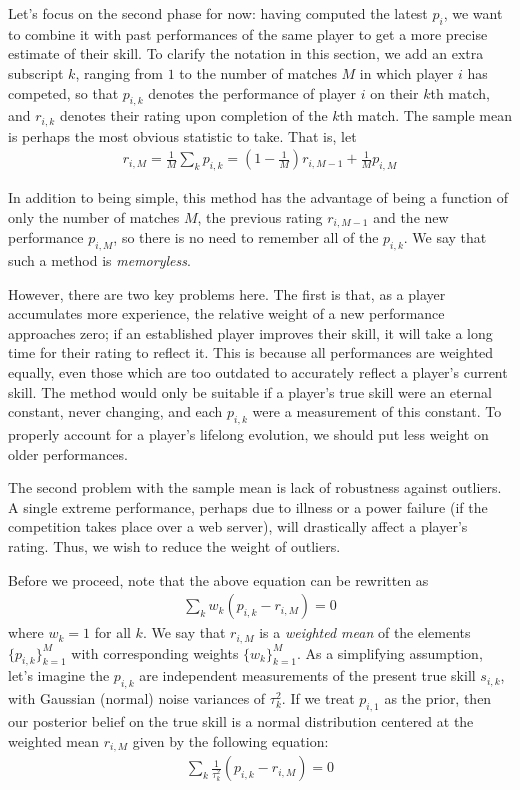 \documentclass{article}
\begin{document}
Let's focus on the second phase for now: having computed the latest $p_i$, we want to combine it with past performances of the same player to get a more precise estimate of their skill. To clarify the notation in this section, we add an extra subscript $k$, ranging from $1$ to the number of matches $M$ in which player $i$ has competed, so that $p_{i,k}$ denotes the performance of player $i$ on their $k$th match, and $r_{i,k}$ denotes their rating upon completion of the $k$th match. The sample mean is perhaps the most obvious statistic to take. That is, let
\begin{align}
r_{i,M} = \frac{1}{M} \sum_k p_{i,k} = \left(1 - \frac{1}{M}\right) r_{i,M-1} +  \frac{1}{M} p_{i,M}
\end{align}

In addition to being simple, this method has the advantage of being a function of only the number of matches $M$, the previous rating $r_{i,M-1}$ and the new performance $p_{i,M}$, so there is no need to remember all of the $p_{i,k}$. We say that such a method is \emph{memoryless}.

However, there are two key problems here. The first is that, as a player accumulates more experience, the relative weight of a new performance approaches zero; if an established player improves their skill, it will take a long time for their rating to reflect it. This is because all performances are weighted equally, even those which are too outdated to accurately reflect a player's current skill. The method would only be suitable if a player's true skill were an eternal constant, never changing, and each $p_{i,k}$ were a measurement of this constant. To properly account for a player's lifelong evolution, we should put less weight on older performances.

The second problem with the sample mean is lack of robustness against outliers. A single extreme performance, perhaps due to illness or a power failure (if the competition takes place over a web server), will drastically affect a player's rating. Thus, we wish to reduce the weight of outliers.

Before we proceed, note that the above equation can be rewritten as
\begin{align}
\sum_k w_k(p_{i,k} - r_{i,M}) = 0
\end{align}
where $w_k = 1$ for all $k$. We say that $r_{i,M}$ is a \emph{weighted mean} of the elements $\{p_{i,k}\}_{k=1}^{M}$ with corresponding weights $\{w_k\}_{k=1}^M$. As a simplifying assumption, let's imagine the $p_{i,k}$ are independent measurements of the present true skill $s_{i,k}$, with Gaussian (normal) noise variances of $\tau_k^2$. If we treat $p_{i,1}$ as the prior, then our posterior belief on the true skill is a normal distribution centered at the weighted mean $r_{i,M}$ given by the following equation:
\begin{align}
\sum_k \frac{1}{\tau_k^2} (p_{i,k} - r_{i,M}) = 0
\end{align}
\end{document}
